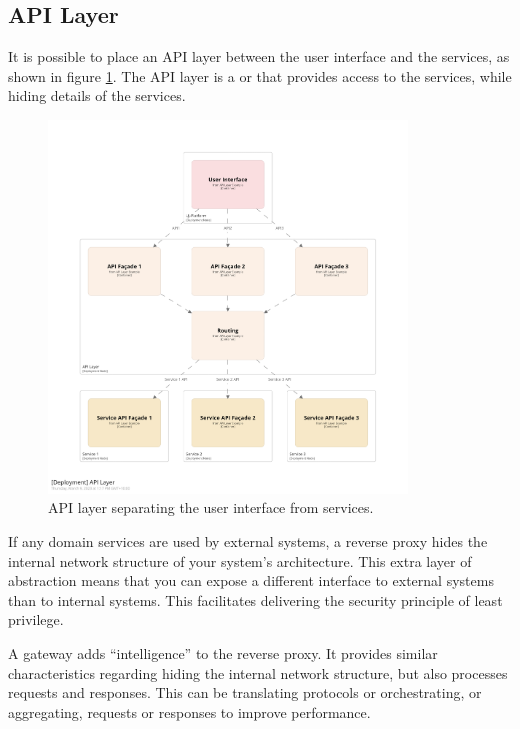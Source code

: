 \subsection{API Layer}

It is possible to place an API layer between the user interface and the services,
as shown in figure \ref{fig:api-layer}.
The API layer is a 
or  that provides access to the services,
while hiding details of the services.

\begin{figure}[h!]
    \centering
    \includegraphics[trim=197 197 197 197,clip,width=0.85\textwidth]{diagrams/api-layer.png}
    \caption{API layer separating the user interface from services.}
    \label{fig:api-layer}
\end{figure}

If any domain services are used by external systems, a reverse proxy hides the internal network structure of your system's architecture.
This extra layer of abstraction means that you can expose a different interface to external systems than to internal systems.
This facilitates delivering the security principle of least privilege.

A gateway adds ``intelligence'' to the reverse proxy.
It provides similar characteristics regarding hiding the internal network structure,
but also processes requests and responses.
This can be translating protocols or orchestrating, or aggregating, requests or responses to improve performance.

